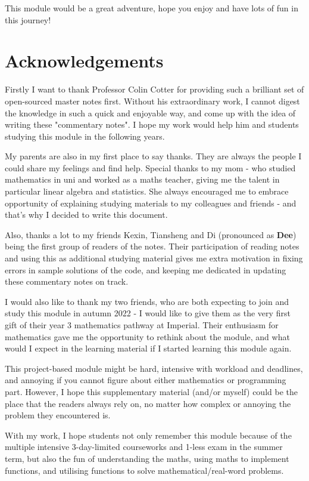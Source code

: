 \documentclass[a4paper,11pt,twoside]{report}
\begin{document}
This module would be a great adventure, hope you enjoy and have lots of fun in this journey!

\chapter*{Acknowledgements}
Firstly I want to thank Professor Colin Cotter for providing such a brilliant set of open-sourced master notes first.
Without his extraordinary work, I cannot digest the knowledge in such a quick and enjoyable way, and come up with the idea of writing these "commentary notes". 
I hope my work would help him and students studying this module in the following years.\smallskip

My parents are also in my first place to say thanks. They are always the people I could share my feelings and find help. Special thanks to my mom - who studied mathematics in uni and worked as a maths teacher, giving me the talent in particular linear algebra and statistics. She always encouraged me to embrace opportunity of explaining studying materials to my colleagues and friends - and that's why I decided to write this document.\smallskip

Also, thanks a lot to my friends Kexin, Tiansheng and Di (pronounced as \textbf{Dee}) being the first group of readers of the notes. Their participation of reading notes and using this as additional studying material gives me extra motivation in fixing errors in sample solutions of the code, and keeping me dedicated in updating these commentary notes on track.\smallskip

I would also like to thank my two friends, who are both expecting to join and study this module in autumn 2022 - I would like to give them as the very first gift of their year 3 mathematics pathway at Imperial. Their enthusiasm for mathematics gave me the opportunity to rethink about the module, and what would I expect in the learning material if I started learning this module again.\smallskip

This project-based module might be hard, intensive with workload and deadlines, and annoying if you cannot figure about either mathematics or programming part. However, I hope this supplementary material (and/or myself) could be the place that the readers always rely on, no matter how complex or annoying the problem they encountered is.\smallskip

With my work, I hope students not only remember this module because of the multiple intensive 3-day-limited courseworks and 1-less exam in the summer term, but also the fun of understanding the maths, using maths to implement functions, and utilising functions to solve mathematical/real-word problems.
\tableofcontents
\listoffigures
\end{document}
